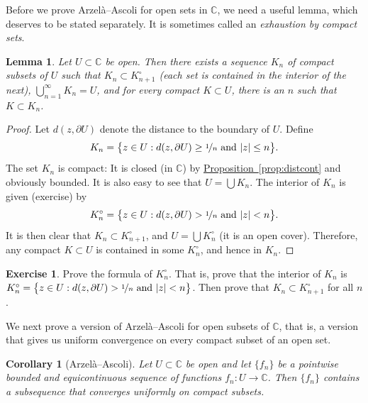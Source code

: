 \documentclass[12pt,openany]{book}
\newcommand{\sabs}[1]{\lvert {#1} \rvert}
\newcommand{\C}{{\mathbb{C}}}
\newcommand{\myindex}[1]{#1\index{#1}}
\theoremstyle{plain}
\newtheorem{lemma}[thm]{Lemma}
\newtheorem{cor}[thm]{Corollary}
\theoremstyle{remark}
\theoremstyle{definition}
\newenvironment{exbox}{%
    \def\FrameCommand{\vrule width 1pt \relax\hspace{10pt}}%
    \MakeFramed{\advance\hsize-\width\FrameRestore}%
}{%
    \endMakeFramed
}
\theoremstyle{exercise}
\newtheorem{exercise}{Exercise}[section]
\theoremstyle{example}
\newcommand{\propref}[1]{\hyperref[#1]{Proposition~\ref*{#1}}}
\begin{document}
Before we prove 
Arzel\`a--Ascoli for open sets in $\C$, we need a useful
lemma, which deserves to be stated separately.
It is sometimes called an \emph{\myindex{exhaustion by compact sets}}.

\begin{lemma}\label{lemma:compactexhaustion}
Let $U \subset \C$ be open.  Then there exists a sequence $K_n$
of compact subsets of $U$ such that $K_n \subset K^\circ_{n+1}$ (each set
is contained in the interior of the next), $\bigcup_{n=1}^\infty K_n = U$, and
for every compact $K \subset U$, there is an $n$ such that $K \subset K_n$.
\end{lemma}

\begin{proof}
Let $d(z,\partial U)$ denote the distance to the boundary of $U$.  Define
\begin{equation*}
K_n = \bigl\{
z \in U : d(z,\partial U) \geq \nicefrac{1}{n} \text{ and } \sabs{z} \leq
n
\bigr\} .
\end{equation*}
The set $K_n$ is compact: It is closed (in $\C$) by
\propref{prop:distcont} and obviously bounded.
It is also easy to see that $U = \bigcup K_n$.  The interior
of $K_n$ is given (exercise) by
\begin{equation*}
K^\circ_n =
\bigl\{
z \in U : d(z,\partial U) > \nicefrac{1}{n} \text{ and } \sabs{z} < n
\bigr\} .
\end{equation*}
It is then clear that $K_n \subset K^\circ_{n+1}$, and
$U = \bigcup K^\circ_n$ (it is an open cover).
Therefore, any compact $K \subset U$
is contained in some $K^\circ_n$, and hence in $K_n$.
\end{proof}

\begin{exbox}
\begin{exercise}
Prove the formula of $K^\circ_n$.  That is, prove that the interior
of $K_n$ is
$K^\circ_n = \bigl\{
z \in U : d(z,\partial U) > \nicefrac{1}{n} \text{ and } \sabs{z} < n
\bigr\}$.  Then prove that $K_n \subset K^\circ_{n+1}$ for all $n$.
\end{exercise}
\end{exbox}

We next prove a version of Arzel\`a--Ascoli for open subsets of $\C$,
that is,
a version that gives us uniform convergence
on every compact subset of an open set.

\begin{cor}[Arzel\`a--Ascoli]
\label{cor:arzelaascoliplane}
Let $U \subset \C$ be open and let $\{ f_n \}$
be a pointwise bounded and equicontinuous sequence
of functions $f_n \colon U \to \C$.  Then
$\{ f_n \}$ contains a subsequence
that converges uniformly on compact subsets.
\end{cor}
\end{document}
